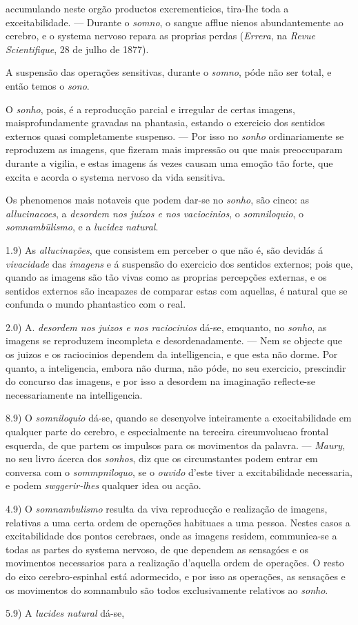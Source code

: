 accumulando neste orgão productos excrementicios, tira-Ihe toda a exceitabilidade. --- Durante o \emph{somno}, o sangue afflue nienos abundantemente ao cerebro, e o systema nervoso repara as proprias perdas (\emph{Errera}, na \emph{Revue Scientifique}, 28 de julho de 1877).\par A suspensão das operações sensitivas, durante o \emph{somno}, póde não ser total, e então temos o \emph{sono}.\par O \emph{sonho}, pois, é a reproducção parcial e irregular de certas imagens, maisprofundamente gravadas na phantasia, estando o exercicio dos sentidos externos quasi completamente suspenso. --- Por isso no \emph{sonho} ordinariamente se reproduzem as imagens, que fizeram mais impressão ou que mais preoccuparam durante a vigilia, e estas imagens ás vezes causam uma emoção tão forte, que excita e acorda o systema nervoso da vida sensitiva.\par Os phenomenos mais notaveis que podem dar-se no \emph{sonho}, são cinco: as \emph{allucinacoes}, a \emph{desordem nos juízos e nos vaciocinios}, o \emph{somniloquio}, o \emph{somnambülismo}, e a \emph{lucidez natural}.\par 1.9) As \emph{allucinações}, que consistem em perceber o que não é, são devidás á \emph{vivacidade} das \emph{imagens} e á suspensão do exercicio dos sentidos externos; pois que, quando as imagens são tão vivas como as proprias percepções externas, e os sentidos externos são incapazes de comparar estas com aquellas, é natural que se confunda o mundo phantastico com o real.\par 2.0) A. \emph{desordem nos juizos e nos raciocinios} dá-se, emquanto, no \emph{sonho}, as imagens se reproduzem incompleta e desordenadamente. --- Nem se objecte que os juizos e os raciocinios dependem da intelligencia, e que esta não dorme. Por quanto, a inteligencia, embora não durma, não póde, no seu exercicio, prescindir do concurso das imagens, e por isso a desordem na imaginação reflecte-se necessariamente na intelligencia.\par 8.9) O \emph{somniloquio} dá-se, quando se desenyolve inteiramente a exocitabilidade em qualquer parte do cerebro, e especialmente na terceira cireumvolucao frontal esquerda, de que partem os impulsos para os movimentos da palavra. --- \emph{Maury}, no seu livro ácerca dos \emph{sonhos}, diz que os circumstantes podem entrar em conversa com o \emph{sommpniloquo}, se o \emph{ouvido} d'este tiver a excitabilidade necessaria, e podem \emph{swggerir-lhes} qualquer idea ou acção.\par 4.9) O \emph{somnambulismo} resulta da viva reproducção e realização de imagens, relativas a uma certa ordem de operações habituaes a uma pessoa. Nestes casos a excitabilidade dos pontos cerebraes, onde as imagens residem, communiea-se a todas as partes do systema nervoso, de que dependem as sensagóes e os movimentos necessarios para a realização d'aquella ordem de operações. O resto do eixo cerebro-espinhal está adormecido, e por isso as operações, as sensações e os movimentos do somnambulo são todos exclusivamente relativos ao \emph{sonho}.\par 5.9) A \emph{lucides natural} dá-se, 